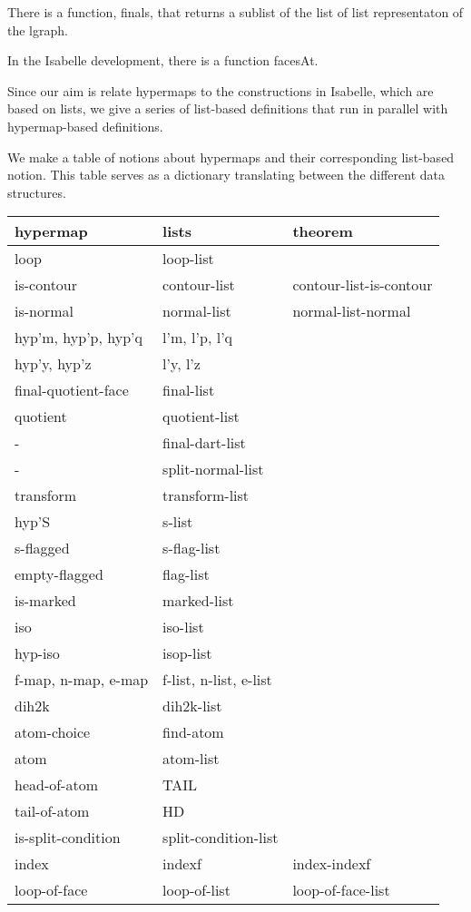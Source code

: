 There is a function, finals, that returns a sublist of the
list of list representaton of the lgraph.

In the Isabelle development, there is a function facesAt.



Since our aim is relate hypermaps to the constructions in Isabelle, which
are based on lists, we give a series of list-based definitions that run
in parallel with hypermap-based definitions.

We make a table of notions about hypermaps and their corresponding list-based notion.
This table serves as a dictionary translating between the different data structures.

\bigskip
\begin{tabular}{l l l}
\hline
{\bf hypermap} & {\bf lists} & {\bf theorem}\\ \hline
loop & loop-list \\
is-contour & contour-list & contour-list-is-contour\\
is-normal & normal-list & normal-list-normal\\
hyp'm, hyp'p, hyp'q & l'm, l'p, l'q \\
hyp'y, hyp'z & l'y, l'z \\
final-quotient-face   & final-list \\
quotient & quotient-list \\
- & final-dart-list \\
- & split-normal-list \\
transform & transform-list \\
hyp'S & s-list \\
s-flagged & s-flag-list \\
empty-flagged & flag-list \\
is-marked & marked-list \\
iso & iso-list \\
hyp-iso & isop-list \\
f-map, n-map, e-map & f-list, n-list, e-list\\
dih2k & dih2k-list\\
atom-choice & find-atom \\
atom & atom-list \\
head-of-atom & TAIL \\
tail-of-atom & HD \\
is-split-condition & split-condition-list \\
index & indexf & index-indexf \\
loop-of-face & loop-of-list & loop-of-face-list \\
\hline
\end{tabular}

